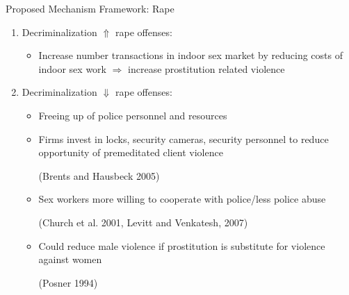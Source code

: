 \documentclass{beamer}
\begin{document}
\begin{frame}{Proposed Mechanism Framework: Rape}
\begin{enumerate}
  \item Decriminalization $\Uparrow$ rape offenses:
  \begin{itemize}
    \item Increase number transactions in indoor sex market by reducing costs of indoor sex work $\Rightarrow$ increase prostitution related violence 
  \end{itemize}
  \item Decriminalization $\Downarrow$ rape offenses:
 \begin{itemize}
   \item Freeing up of police personnel and resources
  \item Firms invest in locks, security cameras, security personnel to reduce opportunity of premeditated client violence \begin{footnotesize}(Brents and Hausbeck 2005)\end{footnotesize}
  \item Sex workers more willing to cooperate with police/less police abuse \begin{footnotesize}(Church et al. 2001, Levitt and Venkatesh, 2007)\end{footnotesize}
   \item Could reduce male violence if prostitution is substitute for violence against women \begin{footnotesize}(Posner 1994)\end{footnotesize}

\end{itemize}
\end{enumerate}
\end{frame}
\end{document}
